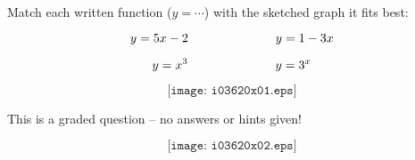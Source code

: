 

Match each written function ($y = \cdots$) with the sketched graph it fits best:

$$y = 5x - 2 \hbox{\hskip 70pt} y = 1 - 3x$$

$$y = x^3 \hbox{\hskip 70pt} y = 3^x$$

$$\texttt{[image: i03620x01.eps]}$$

\vfil

\eject






This is a graded question -- no answers or hints given!







$$\texttt{[image: i03620x02.eps]}$$




